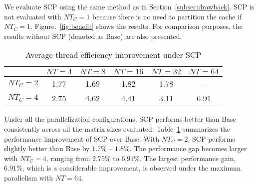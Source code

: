 We evaluate SCP using the same method as in Section~\ref{subsec:drawback}.
SCP is not evaluated with $NT_C=1$ because there is no need
to partition the cache if $NT_C=1$.
Figure.~\ref{fig:benefit} shows the results.
For comparison purposes, the results without SCP
(denoted as Base) are also presented.

\begin{table}
  \centering
  \caption{Average thread efficiency improvement under SCP}
  \label{tab:win}
  \setlength{\tabcolsep}{3.5pt}
  \begin{tabular}{cccccc}
    \toprule
     & $NT=4$ & $NT=8$ & $NT=16$ & $NT=32$ & $NT=64$ \\
    \midrule
    $NT_C=2$ & 1.77 & 1.69 & 1.82 & 1.78 & - \\
    $NT_C=4$ & 2.75 & 4.62 & 4.41 & 3.11 & 6.91 \\
    \bottomrule
  \end{tabular}
\end{table}


Under all the parallelization configurations, 
SCP performs better than Base
consistently across all the matrix sizes evaluated.
Table~\ref{tab:win} summarizes the performance improvement of SCP over Base.
With $NT_C=2$, SCP performs slightly better than Base
by $1.7\%$ -- $1.8\%$.
The performance gap becomes larger with $NT_C=4$,
ranging from $2.75\%$ to $6.91\%$.
The largest performance gain, $6.91\%$, which is a considerable improvement,
is observed under the maximum parallelism with $NT=64$.



